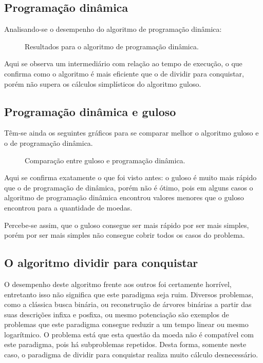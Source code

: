 \documentclass{article}[twocolumn]
\begin{document}
	\subsection{Programa\c{c}\~ao din\^amica}
	Analisando-se o desempenho do algoritmo de programa\c{c}\~ao din\^amica:
	\begin{figure}[H]
		\centering
		\caption{Resultados para o algoritmo de programa\c{c}\~ao din\^amica.}
	\end{figure}
	Aqui se observa um intermedi\'ario com rela\c{c}\~ao ao tempo de execu\c{c}\~ao, o que
	confirma como o algoritmo \'e mais eficiente que o de dividir para conquistar, por\'em
	n\~ao supera os c\'alculos simpl\'isticos do algoritmo guloso.

	\subsection{Programa\c{c}\~ao din\^amica e guloso}
	T\^em-se ainda os seguintes gr\'aficos para se comparar melhor o algoritmo guloso e o de
	programa\c{c}\~ao din\^amica.
	\begin{figure}[H]
		\centering
		\caption{Compara\c{c}\~ao entre guloso e programa\c{c}\~ao din\^amica.}
	\end{figure}
	Aqui se confirma exatamente o que foi visto antes: o guloso \'e muito mais r\'apido
	que o de programa\c{c}\~ao de din\^amica, por\'em n\~ao \'e \'otimo, pois em alguns
	casos o algoritmo de programa\c{c}\~ao din\^amica encontrou valores menores que o guloso
	encontrou para a quantidade de moedas.

	Percebe-se assim, que o guloso consegue ser mais r\'apido por ser mais simples, por\'em
	por ser mais simples n\~ao consegue cobrir todos os casos do problema.

	\subsection{O algoritmo dividir para conquistar}
	O desempenho deste algoritmo frente aos outros foi certamente horr\'ivel, entretanto
	isso n\~ao significa que este paradigma seja ruim. Diversos problemas, como a cl\'assica
	busca bin\'aria, ou reconstru\c{c}\~ao de \'arvores bin\'arias a partir das suas
	descri\c{c}\~oes infixa e posfixa, ou mesmo potencia\c{c}\~ao s\~ao exemplos de problemas
	que este paradigma consegue reduzir a um tempo linear ou mesmo logar\'itmico. O problema
	est\'a que esta quest\~ao da moeda n\~ao \'e compat\'ivel com este paradigma, pois h\'a
	subproblemas repetidos. Desta forma, somente neste caso, o paradigma de dividir para conquistar
	realiza muito c\'alculo desnecess\'ario.
\end{document}
